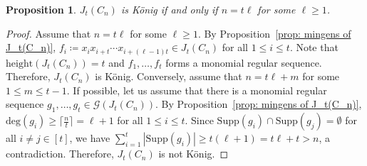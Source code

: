 \documentclass[12pt]{amsart}
\newtheorem{proposition}{Proposition}[section]
\begin{document}
\begin{proposition}\label{prop:Konig}
    $J_t(C_n)$ is K\"onig if and only if $n=t\ell $ for some $\ell\geq 1$.
\end{proposition}
\begin{proof}
  Assume that $n=t\ell$ for some $\ell\geq 1$. By Proposition~\ref{prop: mingens of J_t(C_n)}, $f_i\coloneqq x_ix_{i+t}\cdots x_{i+(\ell-1)t}\in J_t(C_n)$ for all $1\leq i\leq t$. Note that $\mathrm{height}(J_t(C_n))=t$ and $f_1,\dots , f_t$ forms a monomial regular sequence. Therefore, $J_t(C_n)$ is K\"onig. Conversely, assume that $n=t\ell + m$ for some $1\leq m\leq t-1$. If possible, let us assume that there is a monomial regular sequence $g_1, \dots , g_t\in \mathcal{G}(J_t(C_n))$. By Proposition~\ref{prop: mingens of J_t(C_n)}, $\mathrm{deg}(g_i)\geq \lceil\frac{n}{t}\rceil=\ell +1$ for all $1\leq i\leq t$. Since $\mathrm{Supp}(g_i)\cap \mathrm{Supp}(g_j)=\emptyset$ for all $i\neq j\in [t]$, we have $\sum_{i=1}^{t}|\mathrm{Supp}(g_i)|\geq t(\ell +1)=t\ell +t>n$, a contradiction. Therefore, $J_t(C_n)$ is not K\"onig.  
\end{proof}
\end{document}
